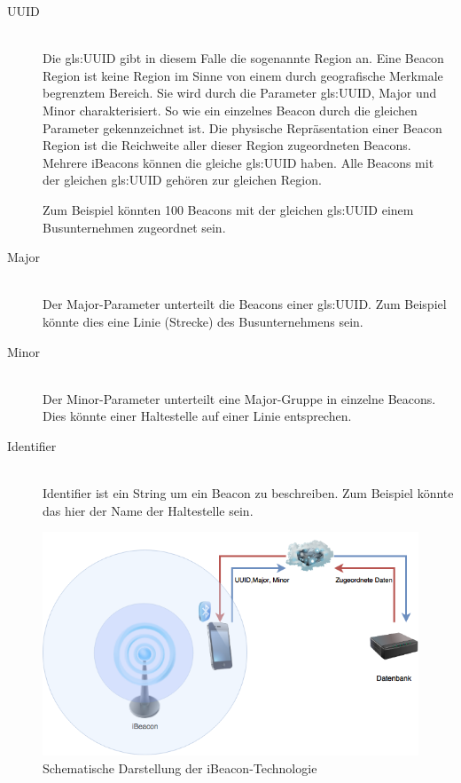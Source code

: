 \begin{description}
\item[UUID] \hfill \\
Die \gls{gls:UUID} gibt in diesem Falle die sogenannte Region an. Eine Beacon Region ist keine Region im Sinne von einem durch geografische 
Merkmale begrenztem Bereich. Sie wird durch die Parameter \gls{gls:UUID}, Major und Minor charakterisiert. So wie ein einzelnes Beacon durch die gleichen Parameter gekennzeichnet ist. Die physische Repräsentation einer Beacon Region ist die Reichweite aller dieser Region zugeordneten Beacons. 
Mehrere iBeacons können die gleiche \gls{gls:UUID} haben. 
Alle Beacons mit der gleichen \gls{gls:UUID} gehören zur gleichen Region. \cite{beaconRegion}

Zum Beispiel könnten 100 Beacons mit der gleichen 
\gls{gls:UUID} einem Busunternehmen zugeordnet sein.
\item[Major] \hfill \\
Der Major-Parameter unterteilt die Beacons einer \gls{gls:UUID}. Zum Beispiel könnte dies eine Linie (Strecke) des Busunternehmens sein.
\item[Minor] \hfill \\
Der Minor-Parameter unterteilt eine Major-Gruppe in einzelne Beacons. Dies könnte einer Haltestelle auf einer Linie entsprechen.
\item[Identifier]\hfill \\
Identifier ist ein String um ein Beacon zu beschreiben. Zum Beispiel könnte das hier der Name der Haltestelle sein.
\end{description}

\begin{figure}[htbp]
	\centering
	\includegraphics[scale=0.7]{images/iBeacon_schema.png}
	\caption{Schematische Darstellung der iBeacon-Technologie}
	\label{img:ibeacon}
\end{figure} 

